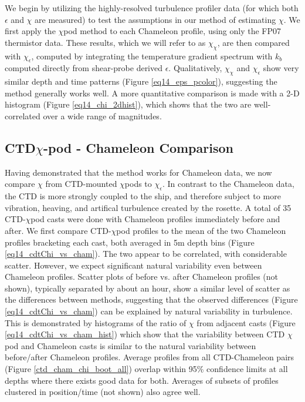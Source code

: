 \documentclass{ametsoc}
\begin{document}
We begin by utilizing the highly-resolved turbulence profiler data (for which both $\epsilon$ and $\chi$ are measured) to test the assumptions in our method of estimating $\chi$. We first apply the $\chi$pod method to each Chameleon profile, using only the FP07 thermistor data. These results, which we will refer to as $\chi_{\chi}$, are then compared with $\chi_{\epsilon}$, computed by integrating the temperature gradient spectrum with $k_b$ computed directly from shear-probe derived $\epsilon$. Qualitatively, $\chi_{\chi}$ and $\chi_{\epsilon}$ show very similar depth and time patterns (Figure \ref{eq14_eps_pcolor}), suggesting the method generally works well. A more quantitative comparison is made with a 2-D histogram (Figure \ref{eq14_chi_2dhist}), which shows that the two are well-correlated over a wide range of magnitudes. 



\subsection{ CTD$\chi$-pod - Chameleon Comparison}

Having demonstrated that the method works for Chameleon data, we now compare $\chi$ from CTD-mounted $\chi$pods to $\chi_{\epsilon}$. In contrast to the Chameleon data, the CTD is more strongly coupled to the ship, and therefore subject to more vibration, heaving, and artifical turbulence created by the rosette. A total of 35 CTD-$\chi$pod casts were done with Chameleon profiles immediately before and after. We first compare CTD-$\chi$pod profiles to the mean of the two Chameleon profiles bracketing each cast, both averaged in 5m depth bins (Figure \ref{eq14_cdtChi_vs_cham}). The two appear to be correlated, with considerable scatter. However, we expect significant natural variability even between Chameleon profiles. Scatter plots of before vs. after Chameleon profiles (not shown), typically separated by about an hour, show a similar level of scatter as the differences between methods, suggesting that the observed differences (Figure \ref{eq14_cdtChi_vs_cham}) can be explained by natural variability in turbulence. This is demonstrated by histograms of the ratio of $\chi$ from adjacent casts (Figure \ref{eq14_cdtChi_vs_cham_hist}) which show that the variability between CTD $\chi$pod and Chameleon casts is similar to the natural variability between before/after Chameleon profiles. Average profiles from all CTD-Chameleon pairs (Figure \ref{ctd_cham_chi_boot_all}) overlap within 95\% confidence limits at all depths where there exists good data for both. Averages of subsets of profiles clustered in position/time (not shown) also agree well. 
\end{document}
